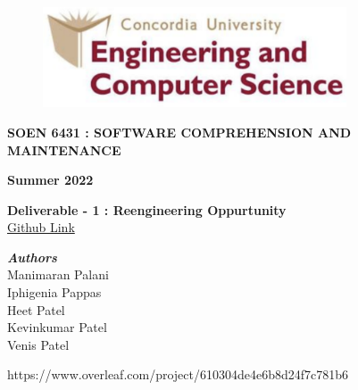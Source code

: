 \documentclass[letterpaper, 11pt]{report}
\begin{document}
\begin{titlepage}
\vspace*{0.7in}
\begin{center}
\begin{figure}[htb]
\begin{center}
\includegraphics[width=9cm]{D1-Reengineering Opportunity/images/univ_logo.png}
\end{center}
\end{figure}
\vspace*{0.3in}
\begin{Large}
\textbf{SOEN 6431 : SOFTWARE COMPREHENSION AND MAINTENANCE} \\
\end{Large}
\vspace*{0.1in}
\begin{Large}
\textbf{Summer 2022} \\
\end{Large}
\vspace*{0.9in}
\begin{Large}
\textbf{Deliverable - 1 : Reengineering Oppurtunity} \\
\href{https://github.com/manimayan/SOEN_6431_Deja_Vu}{Github Link}\\
\end{Large}
\vspace*{0.75in}
\begin{Large}
\textbf{\emph{Authors}} \\
\vspace*{0.2in}
Manimaran Palani\\
Iphigenia Pappas\\
Heet Patel\\
Kevinkumar Patel\\
Venis Patel \\
\end{Large}
\end{center}
\begin{center}
\vspace*{0.9in}
https://www.overleaf.com/project/610304de4e6b8d24f7c781b6\end{center}
\end{titlepage}
\end{document}
